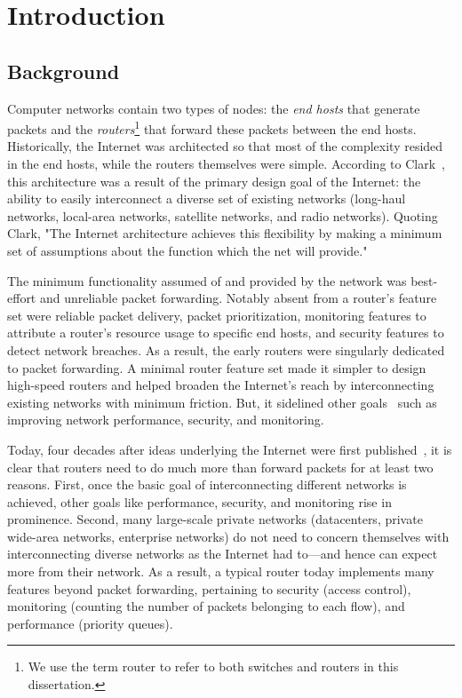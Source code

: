 \chapter{Introduction}
\label{chap:intro}

\section{Background}

Computer networks contain two types of nodes: the {\em end hosts} that generate
packets and the {\em routers}\footnote{We use the term router to refer to both
switches and routers in this dissertation.} that forward these packets between
the end hosts. Historically, the Internet was architected so that most of the
complexity resided in the end hosts, while the routers themselves were simple.
According to Clark~\cite{design_philosophy}, this architecture was a result of
the primary design goal of the Internet: the ability to easily interconnect a
diverse set of existing networks (\eg long-haul networks, local-area networks,
satellite networks, and radio networks). Quoting Clark, "The Internet
architecture achieves this flexibility by making a minimum set of assumptions
about the function which the net will provide."

The minimum functionality assumed of and provided by the network was
best-effort and unreliable packet forwarding. Notably absent from a router's
feature set were reliable packet delivery, packet prioritization, monitoring
features to attribute a router's resource usage to specific end hosts, and
security features to detect network breaches. As a result, the early routers
were singularly dedicated to packet forwarding. A minimal router feature set
made it simpler to design high-speed routers and helped broaden the Internet's
reach by interconnecting existing networks with minimum friction. But, it
sidelined other goals~\cite{design_philosophy} such as improving network
performance, security, and monitoring.
 
Today, four decades after ideas underlying the Internet were first
published~\cite{cerf74}, it is clear that routers need to do much more than
forward packets for at least two reasons. First, once the basic goal of
interconnecting different networks is achieved, other goals like performance,
security, and monitoring rise in prominence.  Second, many large-scale private
networks (\eg datacenters, private wide-area networks, enterprise networks) do
not need to concern themselves with interconnecting diverse networks as the
Internet had to---and hence can expect more from their network. As a result, a
typical router today implements many features beyond packet forwarding,
pertaining to security (\eg access control), monitoring (\eg counting the
number of packets belonging to each flow), and performance (\eg priority
queues).

